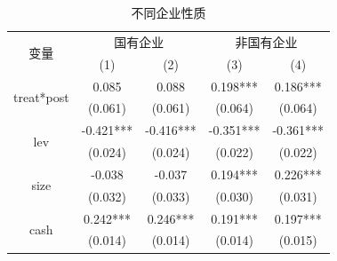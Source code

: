 \documentclass{beamer}	%
\theoremstyle{plain}
\theoremstyle{definition}
\theoremstyle{remark}
\numberwithin{equation}{section}
\begin{document}
\begin{frame}
	\begin{table}[htbp]
		\tiny
		\centering
		\caption{不同企业性质}
		\label{不同企业性质}
		\begin{tabular}{ccccc}
			\toprule
			\multirow{2}[3]{*}{变量}      &                                  \multicolumn{2}{c}{国有企业}                                   &                                    \multicolumn{2}{c}{非国有企业}                                    \\
			\cmidrule{2-5}          &                     (1)                      &                     (2)                      &                      (3)                       &                      (4)                       \\
			\multirow{2}[0]{*}{treat*post}  & \textcolor[rgb]{1.000, 0.000, 0.000}{0.085 } & \textcolor[rgb]{1.000, 0.000, 0.000}{0.088 } & \textcolor[rgb]{1.000, 0.000, 0.000}{0.198***} & \textcolor[rgb]{1.000, 0.000, 0.000}{0.186***} \\
			&                   (0.061)                    &                   (0.061)                    &                    (0.064)                     &                    (0.064)                     \\
			\multirow{2}[0]{*}{lev}      &                  -0.421***                   &                  -0.416***                   &                   -0.351***                    &                   -0.361***                    \\
			&                   (0.024)                    &                   (0.024)                    &                    (0.022)                     &                    (0.022)                     \\
			\multirow{2}[0]{*}{size}     &                   -0.038                    &                   -0.037                    &                    0.194***                    &                    0.226***                    \\
			&                   (0.032)                    &                   (0.033)                    &                    (0.030)                     &                    (0.031)                     \\
			\multirow{2}[0]{*}{cash}     &                   0.242***                   &                   0.246***                   &                    0.191***                    &                    0.197***                    \\
			&                   (0.014)                    &                   (0.014)                    &                    (0.014)                     &                    (0.015)                     \\

\end{tabular}
\end{table}
\end{frame}
\end{document}
